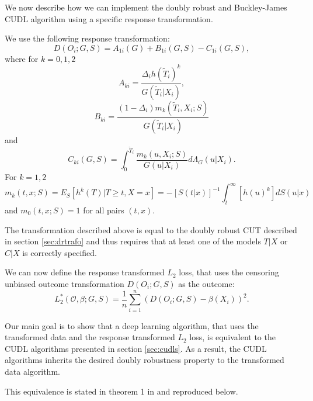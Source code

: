 \documentclass[12pt, a4paper]{article}
\theoremstyle{definition}
\theoremstyle{plain}
\numberwithin{equation}{section}
\numberwithin{figure}{section}
\numberwithin{table}{section}
\begin{document}
	We now describe how we can implement the doubly robust and Buckley-James CUDL algorithm using a specific response transformation.
	
	
	We use the following response transformation:
	\begin{equation*}
	D(O_i; G,S) = A_{1i}(G)+B_{1i}(G,S) - C_{1i}(G,S),
	\end{equation*}
	where for $k=0,1,2$
	\begin{equation*}
	A_{ki} = \frac{\Delta_i h(\tilde{T}_i)^k}{G(\tilde{T}_i\vert X_i)},
	\end{equation*}
	\begin{equation*}
	B_{ki} = \frac{(1-\Delta_i)m_k(\tilde{T}_i, X_i; S)}{G(\tilde{T}_i\vert X_i)}
	\end{equation*}
	and
	\begin{equation*}
	C_{ki} (G,S) = \int_{0}^{\tilde{T}_i} \frac{m_k(u, X_i; S)}{G(u \vert X_i)}d\Lambda_G(u \vert X_i).
	\end{equation*}
	For $k=1,2$
	\begin{equation}\label{eq:condexp}
	m_k(t,x;S) = E_S[h^k(T) \vert T \geq t, X = x] = -[S(t\vert x)]^{-1} \int_{t}^{\infty}[h(u)^k]dS(u\vert x)
	\end{equation}
	and $m_0(t,x;S) = 1$ for all pairs $(t,x)$.
	
	The transformation described above is equal to the doubly robust CUT described in section \ref{sec:drtrafo} and thus requires that at least one of the models $T\vert X$ or $C \vert X$ is correctly specified.
	
	We can now define the response transformed $L_2$ loss, that uses the censoring unbiased outcome transformation $D(O_i;G,S)$ as the outcome:
	\begin{equation*}
	L_2^*(\mathcal{O}, \beta; G,S) = \frac{1}{n} \sum_{i=1}^n (D(O_i;G,S)-\beta(X_i))^2.
	\end{equation*}
	
	Our main goal is to show that a deep learning algorithm, that uses the transformed data and the response transformed $L_2$ loss, is equivalent to the CUDL algorithms presented in section \ref{sec:cudls}.
	As a result, the CUDL algorithms inherits the desired doubly robustness property to the transformed data algorithm.
	
	This equivalence is stated in theorem 1 in \citet*{basearticle} and reproduced below.
	
\end{document}
